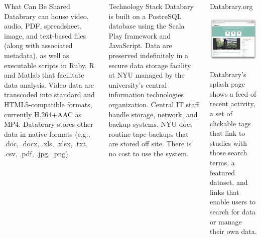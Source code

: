 \documentclass[final]{beamer}
\begin{document}
\begin{frame}{}
\begin{columns}[t]
\begin{block}{What Can Be Shared}
			Databrary can house video, audio, PDF, spreadsheet, image, and text-based files (along with associated metadata), as well as executable scripts in Ruby, R and Matlab that facilitate data analysis.
			Video data are transcoded into standard and HTML5-compatible formats, currently H.264+AAC as MP4. Databrary stores other data in native formats (e.g., .doc, .docx, .xls, .xlsx, .txt, .csv, .pdf, .jpg, .png).
		\end{block}
		\begin{block}{Technology Stack}
			Databary is built on a PostreSQL database using the Scala Play framework and JavaScript.
			Data are preserved indefinitely in a secure data storage facility at NYU managed by the university's central information technologies organization. Central IT staff handle storage, network, and backup systems. NYU does routine tape backups that are stored off site. There is no cost to use the system.
		\end{block}
		\begin{block}{Databrary.org}
			\begin{center}
				\includegraphics[width=\textwidth]{img/databrary-splash.png}
			\end{center}
			Databrary's splash page shows a feed of recent activity, a set of clickable tags that link to studies with those search terms, a featured dataset, and links that enable users to search for data or manage their own data.
		\end{block}

\end{columns}
\end{frame}
\end{document}
